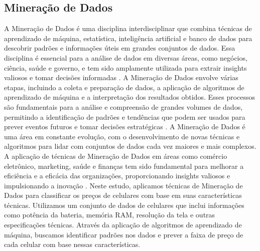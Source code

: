 \documentclass[conference]{IEEEtran}
\begin{document}
\subsection{Mineração de Dados}
A Mineração de Dados é uma disciplina interdisciplinar que combina técnicas de
aprendizado de máquina, estatística, inteligência artificial e banco de dados para
descobrir padrões e informações úteis em grandes conjuntos de dados.
Essa disciplina é essencial para a análise de dados em diversas áreas, como
negócios, ciência, saúde e governo, e tem sido amplamente utilizada para
extrair insights valiosos e tomar decisões informadas \cite{Han2011}.
A Mineração de Dados envolve várias etapas, incluindo a coleta e preparação de
dados, a aplicação de algoritmos de aprendizado de máquina e a interpretação dos
resultados obtidos. Esses processos são fundamentais para a análise e
compreensão de grandes volumes de dados, permitindo a identificação de padrões
e tendências que podem ser usados para prever eventos futuros e tomar decisões
estratégicas \cite{Witten2011}.
A Mineração de Dados é uma área em constante evolução, com o desenvolvimento de
novas técnicas e algoritmos para lidar com conjuntos de dados cada vez maiores e
mais complexos. A aplicação de técnicas de Mineração de Dados em áreas como
comércio eletrônico, marketing, saúde e finanças tem sido fundamental para
melhorar a eficiência e a eficácia das organizações, proporcionando insights
valiosos e impulsionando a inovação \cite{Fayyad1996}.
Neste estudo, aplicamos técnicas de Mineração de Dados para classificar os preços
de celulares com base em suas características técnicas. Utilizamos um conjunto de
dados de celulares que inclui informações como potência da bateria, memória RAM,
resolução da tela e outras especificações técnicas. Através da aplicação de
algoritmos de aprendizado de máquina, buscamos identificar padrões nos dados e
prever a faixa de preço de cada celular com base nessas características.
\end{document}
